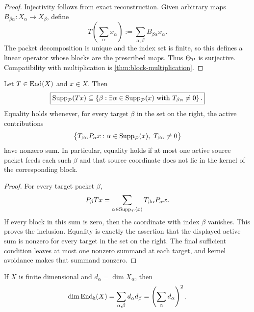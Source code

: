 \begin{proof}
Injectivity follows from exact reconstruction.  Given arbitrary maps $B_{\beta\alpha}:X_\alpha\to X_\beta$, define
\[
T\left(\sum_\alpha x_\alpha\right)
:=
\sum_{\alpha,\beta}B_{\beta\alpha}x_\alpha.
\]
The packet decomposition is unique and the index set is finite, so this defines a linear operator whose blocks are the prescribed maps.  Thus $\Theta_{\mathcal P}$ is surjective.  Compatibility with multiplication is \cref{thm:block-multiplication}.
\end{proof}



\begin{corollary}
\label{cor:packet-support-propagation}
Let \(T\in\operatorname{End}(X)\) and \(x\in X\).  Then
\[
\boxed{
\operatorname{Supp}_{\mathcal P}(Tx)
\subseteq
\left\{\beta:\exists\alpha\in\operatorname{Supp}_{\mathcal P}(x)
\text{ with }T_{\beta\alpha}\neq0\right\}.
}
\]
Equality holds whenever, for every target \(\beta\) in the set on the right, the active contributions
\[
\bigl\{T_{\beta\alpha}P_\alpha x:
\alpha\in\operatorname{Supp}_{\mathcal P}(x),\ T_{\beta\alpha}\neq0\bigr\}
\]
have nonzero sum.  In particular, equality holds if at most one active source packet feeds each such \(\beta\) and that source coordinate does not lie in the kernel of the corresponding block.
\end{corollary}

\begin{proof}
For every target packet \(\beta\),
\[
P_\beta Tx
=
\sum_{\alpha\in\operatorname{Supp}_{\mathcal P}(x)}T_{\beta\alpha}P_\alpha x.
\]
If every block in this sum is zero, then the coordinate with index \(\beta\) vanishes.  This proves the inclusion.  Equality is exactly the assertion that the displayed active sum is nonzero for every target in the set on the right.  The final sufficient condition leaves at most one nonzero summand at each target, and kernel avoidance makes that summand nonzero.
\end{proof}


\begin{corollary}
\label{cor:dimension-count}
If $X$ is finite dimensional and $d_\alpha=\dim X_\alpha$, then
\[
\dim\operatorname{End}_{\Bbbk}(X)
=
\sum_{\alpha,\beta}d_\alpha d_\beta
=
\left(\sum_\alpha d_\alpha\right)^2.
\]
\end{corollary}

